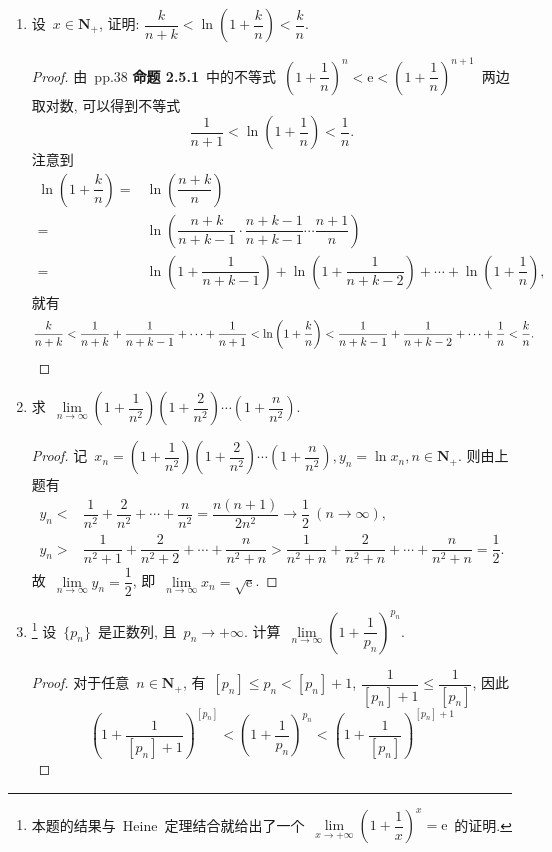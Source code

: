 \documentclass[UTF8,a4paper,11pt,twoside]{book}
\newcommand{\e}{\mathrm e}
\begin{document}
\begin{enumerate}
	\item 设~$x\in\mathbf{N}_{+}$, 证明: $\dfrac{k}{n+k}<\ln\left(1+\dfrac{k}{n}\right)<\dfrac{k}{n}$.
	      \begin{proof}
		      由~pp.38 {\bf 命题 2.5.1}~中的不等式~$\left(1+\dfrac{1}{n}\right)^n<\e<\left(1+\dfrac{1}{n}\right)^{n+1}$~两边取对数, 可以得到不等式
		      \[
			      \dfrac{1}{n+1}<\ln\left(1+\dfrac{1}{n}\right)<\dfrac{1}{n}.
		      \]
		      注意到
		      \[
			      \begin{split}
				      \ln\left(1+\dfrac{k}{n}\right)=&\ln\left(\dfrac{n+k}{n}\right)\\
				      =&\ln\left(\dfrac{n+k}{n+k-1}\cdot\dfrac{n+k-1}{n+k-1}\cdots\dfrac{n+1}{n}\right)\\
				      =&\ln\left(1+\dfrac{1}{n+k-1}\right)+\ln\left(1+\dfrac{1}{n+k-2}\right)+\cdots+\ln\left(1+\dfrac{1}{n}\right),
			      \end{split}
		      \]
		      就有
		      \[
			      \dfrac{k}{n+k}<\dfrac{1}{n+k}+\dfrac{1}{n+k-1}+\cdots+\dfrac{1}{n+1}<\ln\left(1+\dfrac{k}{n}\right)<\dfrac{1}{n+k-1}+\dfrac{1}{n+k-2}+\cdots+\dfrac{1}{n}<\dfrac{k}{n}.\qedhere
		      \]
	      \end{proof}
	\item 求~$\lim\limits_{n\to\infty} \left(1+\dfrac{1}{n^2}\right)\left(1+\dfrac{2}{n^2}\right)\cdots\left(1+\dfrac{n}{n^2}\right)$.
	      \begin{proof}
		      记~$x_n=\left(1+\dfrac{1}{n^2}\right)\left(1+\dfrac{2}{n^2}\right)\cdots\left(1+\dfrac{n}{n^2}\right), y_n=\ln{x_n}, n\in\mathbf{N}_{+}$. 则由上题有
		      \[
			      \begin{split}
				      y_n<&\dfrac{1}{n^2}+\dfrac{2}{n^2}+\cdots+\dfrac{n}{n^2}=\dfrac{n(n+1)}{2n^2}\to\dfrac{1}{2} \ (n\to\infty),\\
				      y_n>&\dfrac{1}{n^2+1}+\dfrac{2}{n^2+2}+\cdots+\dfrac{n}{n^2+n}>\dfrac{1}{n^2+n}+\dfrac{2}{n^2+n}+\cdots+\dfrac{n}{n^2+n}=\dfrac{1}{2}.
			      \end{split}
		      \]
		      故~$\lim\limits_{n\to\infty} y_n=\dfrac{1}{2}$, 即~$\lim\limits_{n\to\infty} x_n=\sqrt{\e}$.\qedhere
	      \end{proof}
	\item \footnote{本题的结果与~Heine~定理结合就给出了一个~$\lim\limits_{x\to+\infty} \left(1+\dfrac{1}{x}\right)^{x}=\e$~的证明.} 设~$\{p_n\}$~是正数列, 且~$p_n\to+\infty$. 计算~$\lim\limits_{n\to\infty} \left(1+\dfrac{1}{p_n}\right)^{p_n}$.
	      \begin{proof}
		      对于任意~$n\in\mathbf{N}_{+}$, 有~$[p_n]\leqslant p_n<[p_n]+1$, $\dfrac{1}{[p_n]+1}\leqslant\dfrac{1}{[p_n]}$, 因此
		      \[
			      \left(1+\dfrac{1}{[p_n]+1}\right)^{[p_n]}<\left(1+\dfrac{1}{p_n}\right)^{p_n}<\left(1+\dfrac{1}{[p_n]}\right)^{[p_n]+1}
		      \]


\end{proof}
\end{enumerate}
\end{document}
